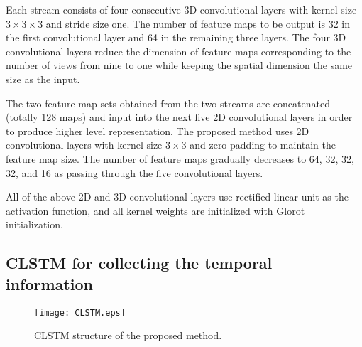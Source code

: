 \documentclass[]{spie}
\newcommand{\jtextd}[1]{}
\begin{document}
Each stream consists of four consecutive 3D convolutional layers
with kernel size $3\times 3\times 3$ and stride size one.
The number of feature maps to be output is 
32 in the first convolutional layer and 
64 in the remaining three layers.
The four 3D convolutional layers reduce the dimension of feature maps
corresponding to the number of views from nine to one while keeping
the spatial dimension the same size as the input.

\jtextd{
   2つのストリームで抽出された特徴マップを連結することで得られる128個の特徴マップに対し，
   より高度な表現を生成するために5層の2次元畳み込みを適用する．
   2次元畳み込みはすべて$3 \times 3$カーネルを使用し，
   特徴マップサイズを維持するためにゼロパディングを適用する．
   特徴マップの数は，5層の畳み込み層によって
   64，32，32，32，16と徐々に減少する．
}

The two feature map sets obtained from the two streams are
concatenated (totally 128 maps) and input into the next five
2D convolutional layers
in order to produce higher level representation.
The proposed method uses 2D convolutional layers with kernel size $3
\times 3$ and zero padding to maintain the feature map size.
The number of feature maps gradually decreases to 64, 32, 32, 32, and
16 as passing through the five convolutional layers.

\jtextd{
   上記の全ての2次元，3次元畳み込み層において，活性化関数としてReLUを適用する．
   また，このプロセスで使用される全てのカーネルは
   Glorotの一様分布
を用いて初期化される．
}

All of the above 2D and 3D convolutional layers use rectified
linear unit as the activation function, 
and all kernel weights are initialized with Glorot
initialization.


\subsection{CLSTM for collecting the temporal information}
\begin{figure}[tbp]
  \centering
  \texttt{[image: CLSTM.eps]}
  \caption{CLSTM structure of the proposed method.}
  \label{fig:CLSTM}
\end{figure}
\end{document}
